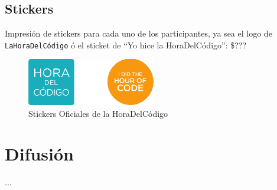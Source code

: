 \documentclass[letterpaper,12pt]{article}
\begin{document}
\subsection{Stickers}

Impresión de stickers para cada uno de los participantes, ya sea el logo de \texttt{LaHoraDelCódigo} ó el sticket de ``Yo hice la HoraDelCódigo'': \$???

\begin{figure}[H]
  \centering
    \includegraphics[width=0.5\textwidth]{sticker}
  \caption{Stickers Oficiales de la HoraDelCódigo}
\end{figure}

\section{Difusión}

...
\end{document}

